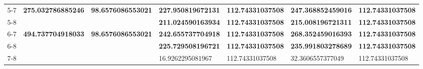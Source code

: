 \begin{table}[ht]
\begin{tabular}{rllllll}
  5-7 & \textbf{275.032786885246} & \textbf{98.6576086553021} & \textbf{227.950819672131} & \textbf{112.74331037508} & \textbf{247.368852459016} & \textbf{112.74331037508} \\ 
  5-8 &  &  & \textbf{211.024590163934} & \textbf{112.74331037508} & \textbf{215.008196721311} & \textbf{112.74331037508} \\ 
  6-7 & \textbf{494.737704918033} & \textbf{98.6576086553021} & \textbf{242.655737704918} & \textbf{112.74331037508} & \textbf{268.352459016393} & \textbf{112.74331037508} \\ 
  6-8 &  &  & \textbf{225.729508196721} & \textbf{112.74331037508} & \textbf{235.991803278689} & \textbf{112.74331037508} \\ 
  7-8 &  &  & 16.9262295081967 & 112.74331037508 & 32.3606557377049 & 112.74331037508 \\ 
   \bottomrule
\end{tabular}
\end{table}
